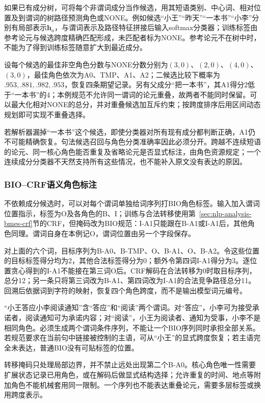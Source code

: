 如果已有成分树，可将每个非谓词成分当作候选，用其短语类别、中心词、相对位置及到谓词的树路径预测角色或NONE。例如候选“小王”“昨天”“一本书”“小李”分别有局部表示$\bm h_a$，与谓词表示及路径特征拼接后输入softmax分类器；训练标签由参考论元与候选跨度精确匹配形成，未匹配者标为NONE。参考论元不在树中时，不能为了得到训练标签随意扩大到最近成分。

设每个候选的最佳非空角色分数与NONE分数分别为$(3,0)$、$(2,0)$、$(4,0)$、$(3,0)$，最佳角色依次为A0、TMP、A1、A2；二候选比较下概率为$.953,.881,.982,.953$，恢复四条期望记录。另有父成分“把一本书”，其A1得分2低于“一本书”的4；本例规范不允许同一谓词的论元重叠，故两者不能同时保留。可以最大化相对NONE的总分，并对重叠候选加互斥约束；按跨度排序后用区间动态规划即可实现不重叠选择。

若解析器漏掉“一本书”这个候选，即使分类器对所有现有成分都判断正确，A1仍不可能精确恢复。句法候选召回与角色分类准确率因此必须分开。跨越不连续短语的论元、同一核心角色能否重复及省略论元是否显式标注，由角色资源规定；一个连续成分分类器不天然支持所有这些情况，也不能补入原文没有表达的原因。

\subsubsection{BIO--CRF语义角色标注}
\label{sec:nlp-analysis-srl-crf}

不依赖成分候选时，可以对每个谓词单独给词序列打BIO角色标签。输入加入谓词位置指示，标签为O及各角色的B、I；训练与合法转移使用第~\ref{sec:nlp-analysis-bmes-crf}节的CRF，但掩码改为BIO规范：I-A1只能跟在B-A1或I-A1后，其他角色同理。谓词自身在本例记O，谓词位置由另一个字段保存。

对上面的六个词，目标序列为B-A0、B-TMP、O、B-A1、O、B-A2。令这些位置的目标标签得分均为2，其他合法标签得分为0；额外令第四词I-A1得分为3。逐位置贪心得到的I-A1不能接在第三词O后。CRF解码在合法转移为0时取目标序列，总分12；另一条只将第三词改为B-A1、第四词改为I-A1的合法竞争路径总分11。回溯后依据词到字符的映射，恢复四个角色跨度，而不是输出模型词元编号。

“小王答应小李阅读通知”含“答应”和“阅读”两个谓词。对“答应”，小李可为接受承诺者，阅读通知可为承诺内容；对“阅读”，小王为阅读者、通知为受事，小李不是相同角色。必须生成两个谓词条件序列，不能让一个BIO序列同时承担全部关系。若规范要求在当前句中链接被控制的主语，可从“小王”的显式跨度恢复；若主语完全未表达，普通BIO没有可贴标签的位置。

转移掩码只处理局部边界，并不禁止远处出现第二个B-A0。核心角色唯一性需要扩展状态记录已用角色，或在解码后做显式结构选择；允许重复的时间、地点等附加角色不能机械套用同一限制。一个序列也不能表达重叠论元，需要多层标签或换用跨度表示。

